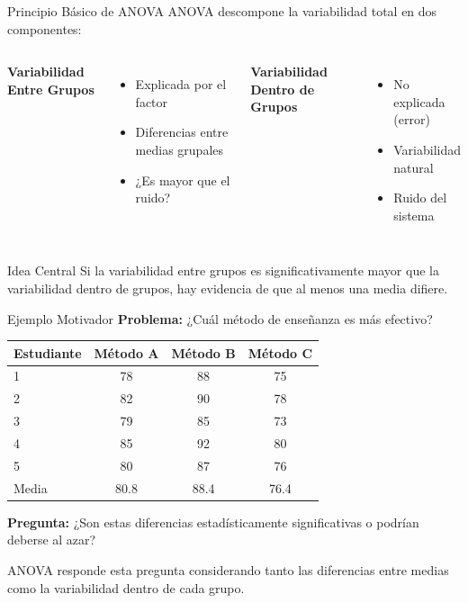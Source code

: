 \documentclass[10pt,aspectratio=169]{beamer}
\begin{document}
\begin{frame}{Principio Básico de ANOVA}
ANOVA descompone la variabilidad total en dos componentes:

\vspace{0.5cm}

\begin{columns}[T]
\textbf{Variabilidad Entre Grupos}
\begin{itemize}
    \item Explicada por el factor
    \item Diferencias entre medias grupales
    \item ¿Es mayor que el ruido?
\end{itemize}

\textbf{Variabilidad Dentro de Grupos}
\begin{itemize}
    \item No explicada (error)
    \item Variabilidad natural
    \item Ruido del sistema
\end{itemize}
\end{columns}

\vspace{0.5cm}

\begin{alertblock}{Idea Central}
Si la variabilidad entre grupos es \alert{significativamente mayor} que la variabilidad dentro de grupos, hay evidencia de que al menos una media difiere.
\end{alertblock}
\end{frame}

\begin{frame}{Ejemplo Motivador}
\textbf{Problema:} ¿Cuál método de enseñanza es más efectivo?

\vspace{0.3cm}

\begin{center}
\begin{tabular}{lccc}
\toprule
Estudiante & Método A & Método B & Método C \\
\midrule
1 & 78 & 88 & 75 \\
2 & 82 & 90 & 78 \\
3 & 79 & 85 & 73 \\
4 & 85 & 92 & 80 \\
5 & 80 & 87 & 76 \\
\midrule
Media & 80.8 & 88.4 & 76.4 \\
\bottomrule
\end{tabular}
\end{center}

\vspace{0.3cm}

\textbf{Pregunta:} ¿Son estas diferencias estadísticamente significativas o podrían deberse al azar?

\vspace{0.2cm}
\alert{ANOVA responde esta pregunta considerando tanto las diferencias entre medias como la variabilidad dentro de cada grupo.}
\end{frame}
\end{document}
